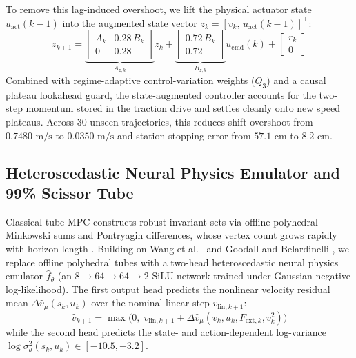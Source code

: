 \documentclass[10pt,a4paper]{article}
\begin{document}
To remove this lag-induced overshoot, we lift the physical actuator state $u_{\text{act}}(k-1)$ into the augmented state vector $z_k = [v_k,\, u_{\text{act}}(k-1)]^\top$:
\begin{equation}
    z_{k+1} =
    \underbrace{\begin{bmatrix}
        A_k & 0.28\, B_k \\
        0   & 0.28
    \end{bmatrix}}_{A_{z,k}} z_k +
    \underbrace{\begin{bmatrix}
        0.72\, B_k \\
        0.72
    \end{bmatrix}}_{B_{z,k}} u_{\text{cmd}}(k) +
    \begin{bmatrix}
        r_k \\
        0
    \end{bmatrix}
    \label{eq:lifted_mpc}
\end{equation}
Combined with regime-adaptive control-variation weights ($Q_3$) and a causal plateau lookahead guard, the state-augmented controller accounts for the two-step momentum stored in the traction drive and settles cleanly onto new speed plateaus. Across 30 unseen trajectories, this reduces shift overshoot from $0.7480\text{ m/s}$ to $0.0350\text{ m/s}$ and station stopping error from $57.1\text{ cm}$ to $8.2\text{ cm}$.

\subsection{Heteroscedastic Neural Physics Emulator and 99\% Scissor Tube}

Classical tube MPC constructs robust invariant sets via offline polyhedral Minkowski sums and Pontryagin differences, whose vertex count grows rapidly with horizon length \cite{mayne2005,cannon2010,sun2024}. Building on Wang et al.\ \cite{wang2023} and Goodall and Belardinelli \cite{goodall2026,goodall_code}, we replace offline polyhedral tubes with a two-head heteroscedastic neural physics emulator $\hat{f}_\theta$ (an $8 \to 64 \to 64 \to 2$ SiLU network trained under Gaussian negative log-likelihood). The first output head predicts the nonlinear velocity residual mean $\Delta\hat{v}_\mu(s_k, u_k)$ over the nominal linear step $v_{\text{lin},k+1}$:
\begin{equation}
    \hat{v}_{k+1} = \max\!\Big(0,\; v_{\text{lin},k+1} + \Delta\hat{v}_\mu(v_k, u_k, F_{\text{ext},k}, v_k^2)\Big)
\end{equation}
while the second head predicts the state- and action-dependent log-variance $\log \sigma_\theta^2(s_k, u_k) \in [-10.5, -3.2]$.
\end{document}
